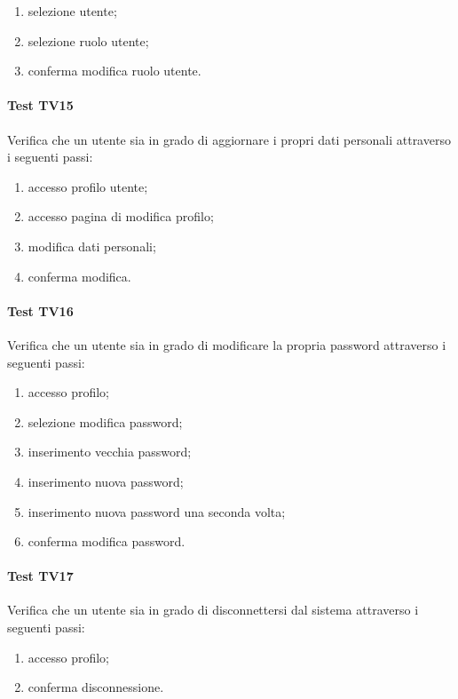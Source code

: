 \documentclass[12pt,a4paper]{article}
\begin{document}
	\begin{enumerate}
		\item selezione utente;
		\item selezione ruolo utente;
		\item conferma modifica ruolo utente.
	\end{enumerate}
	\hypertarget{TV15}{}
	\paragraph{Test TV15}
	Verifica che un utente sia in grado di aggiornare i propri dati personali attraverso i seguenti passi:
	
	\begin{enumerate}
		\item accesso profilo utente;
		\item accesso pagina di modifica profilo;
		\item modifica dati personali;
		\item conferma modifica.
	\end{enumerate}
	\hypertarget{TV16}{}
	\paragraph{Test TV16}
	Verifica che un utente sia in grado di modificare la propria password attraverso i seguenti passi:
	
	\begin{enumerate}
		\item accesso profilo;
		\item selezione modifica password;
		\item inserimento vecchia password;
		\item inserimento nuova password;
		\item inserimento nuova password una seconda volta;
		\item conferma modifica password.
	\end{enumerate}
	\hypertarget{TV17}{}
	\paragraph{Test TV17}
	Verifica che un utente sia in grado di disconnettersi dal sistema attraverso i seguenti passi:
	
	\begin{enumerate}
		\item accesso profilo;
		\item conferma disconnessione.
	\end{enumerate}
	\hypertarget{TV18}{}
\end{document}
